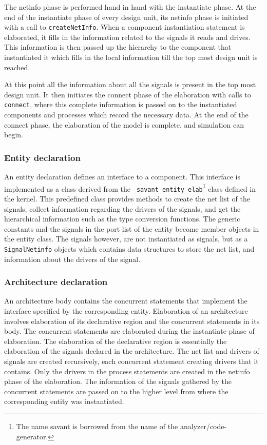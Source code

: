 \documentclass[11pt]{article}
\begin{document}
The netinfo phase is performed hand in hand with the instantiate phase.  At
the end of the instantiate phase of every design unit, its netinfo phase is
initiated with a call to \texttt{createNetInfo}.  When a component
instantiation statement is elaborated, it fills in the information related
to the signals it reads and drives.  This information is then passed up the
hierarchy to the component that instantiated it which fills in the local
information till the top most design unit is reached.

At this point all the information about all the signals is present in the
top most design unit.  It then initiates the connect phase of the
elaboration with calls to \texttt{connect}, where this complete information
is passed on to the instantiated components and processes which record the
necessary data.  At the end of the connect phase, the elaboration of the
model is complete, and simulation can begin.

\subsubsection{Entity declaration}

An entity declaration defines an interface to a component.  This
interface is implemented as a \Cpp\/ class derived from the
\verb|_savant_entity_elab|\footnote{The name savant is borrowed from the
name of the analyzer/code-generator.} class defined in the kernel.
This predefined class provides methods to create the net list of the
signals, collect information regarding the drivers of the signals, and
get the hierarchical information such as the type conversion
functions.  The generic constants and the signals in the port list of
the entity become member objects in the entity class.  The signals
however, are not instantiated as signals, but as a
\texttt{SignalNetinfo} objects which contains data structures to store
the net list, and information about the drivers of the signal.

\subsubsection{Architecture declaration}

An architecture body contains the concurrent statements that implement
the interface specified by the corresponding entity.  Elaboration of
an architecture involves elaboration of its declarative region and the
concurrent statements in its body.  The concurrent statements are
elaborated during the instantiate phase of elaboration.  The
elaboration of the declarative region is essentially the elaboration
of the signals declared in the architecture.  The net list and drivers
of signals are created recursively, each concurrent statement creating
drivers that it contains.  Only the drivers in the process statements
are created in the netinfo phase of the elaboration.  The information
of the signals gathered by the concurrent statements are passed on to
the higher level from where the corresponding entity was instantiated.
\end{document}
